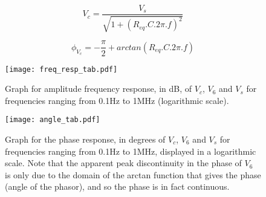\begin{equation}
  V_c = \frac{V_s}{\sqrt{1 + (R_{eq}.C.2\pi.f)^2}}
  \label{eq:freqresp1}
\end{equation}

\begin{equation}
  \phi_{V_c} = -\frac{\pi}{2} + arctan(R_{eq}.C.2\pi.f)
  \label{eq:freqresp2}
\end{equation}

\begin{figure}[H] \centering
\texttt{[image: freq\_resp\_tab.pdf]}
\caption{Graph for amplitude frequency response, in dB, of $V_c$, $V_6$ and $V_s$ for frequencies ranging from 0.1Hz to 1MHz (logarithmic scale).}
\label{fig:freq_resp}
\end{figure}



\begin{figure}[H] \centering
\texttt{[image: angle\_tab.pdf]}
\caption{Graph for the phase response, in degrees of $V_c$, $V_6$ and $V_s$ for frequencies ranging from 0.1Hz to 1MHz, displayed in a logarithmic scale. Note that the apparent peak discontinuity in the phase of $V_6$ is only due to the domain of the arctan function that gives the phase (angle of the phasor), and so the phase is in fact continuous.}
\label{fig:angle_resp}
\end{figure}

\pagebreak


